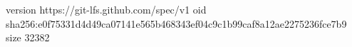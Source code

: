 version https://git-lfs.github.com/spec/v1
oid sha256:e0f75331d4d49ca07141e565b468343ef04c9c1b99caf8a12ae2275236fce7b9
size 32382
